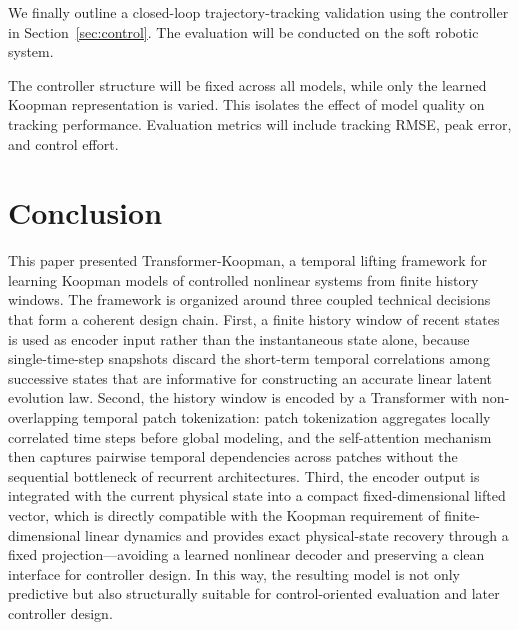 \documentclass[journal]{IEEEtran}
\begin{document}
We finally outline a closed-loop trajectory-tracking validation using the controller in Section~\ref{sec:control}. The evaluation will be conducted on the soft robotic system.

The controller structure will be fixed across all models, while only the learned Koopman representation is varied. This isolates the effect of model quality on tracking performance. Evaluation metrics will include tracking RMSE, peak error, and control effort.

\section{Conclusion}
\label{sec:conclusion}

This paper presented Transformer-Koopman, a temporal lifting framework for learning Koopman models of controlled nonlinear systems from finite history windows. The framework is organized around three coupled technical decisions that form a coherent design chain. First, a finite history window of recent states is used as encoder input rather than the instantaneous state alone, because single-time-step snapshots discard the short-term temporal correlations among successive states that are informative for constructing an accurate linear latent evolution law. Second, the history window is encoded by a Transformer with non-overlapping temporal patch tokenization: patch tokenization aggregates locally correlated time steps before global modeling, and the self-attention mechanism then captures pairwise temporal dependencies across patches without the sequential bottleneck of recurrent architectures. Third, the encoder output is integrated with the current physical state into a compact fixed-dimensional lifted vector, which is directly compatible with the Koopman requirement of finite-dimensional linear dynamics and provides exact physical-state recovery through a fixed projection---avoiding a learned nonlinear decoder and preserving a clean interface for controller design. In this way, the resulting model is not only predictive but also structurally suitable for control-oriented evaluation and later controller design.
\end{document}
